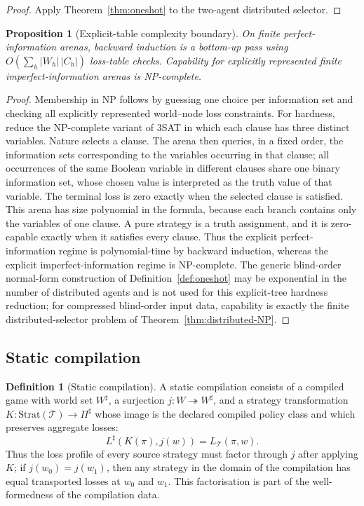 \documentclass[11pt]{article}
\theoremstyle{plain}
\newtheorem{proposition}[theorem]{Proposition}
\theoremstyle{definition}
\newtheorem{definition}[theorem]{Definition}
\theoremstyle{remark}
\begin{document}
\begin{proof}
Apply Theorem~\ref{thm:oneshot} to the two-agent distributed selector.
\end{proof}

\begin{proposition}[Explicit-table complexity boundary]\label{prop:pnp}
On finite perfect-information arenas, backward induction is a bottom-up pass
using $O(\sum_h|W_h|\,|C_h|)$ loss-table checks. Capability for explicitly
represented finite imperfect-information arenas is NP-complete.
\end{proposition}

\begin{proof}
Membership in NP follows by guessing one choice per information set and checking
all explicitly represented world--node loss constraints. For hardness, reduce the NP-complete variant of 3SAT in which each clause has
three distinct variables. Nature selects a clause. The arena then queries, in a
fixed order, the information sets corresponding to the variables occurring in
that clause;
all occurrences of the same Boolean variable in different clauses share one
binary information set, whose chosen value is interpreted as the truth value of
that variable. The terminal loss is zero exactly when the selected clause is
satisfied. This arena has size polynomial in the formula, because each branch
contains only the variables of one clause. A pure strategy is a truth assignment,
and it is zero-capable exactly when it satisfies every clause. Thus the explicit
perfect-information regime is polynomial-time by backward induction, whereas the
explicit imperfect-information regime is NP-complete. The generic blind-order
normal-form construction of Definition~\ref{def:oneshot} may be exponential in
the number of distributed agents and is not used for this explicit-tree hardness
reduction; for compressed blind-order input data, capability is exactly the
finite distributed-selector problem of Theorem~\ref{thm:distributed-NP}.
\end{proof}




\subsection{Static compilation}

\begin{definition}[Static compilation]\label{def:staticcomp}
A static compilation consists of a compiled game with world set $W^\sharp$, a
surjection $j:W\twoheadrightarrow W^\sharp$, and a strategy transformation
$K:\mathrm{Strat}(\mathcal T)\to\Pi^\sharp$ whose image is the declared
compiled policy class and which preserves aggregate losses:
\[
L^\sharp(K(\pi),j(w))=L_{\mathcal T}(\pi,w).
\]
Thus the loss profile of every source strategy must factor through $j$ after
applying $K$; if $j(w_0)=j(w_1)$, then any strategy in the domain of the
compilation has equal transported losses at $w_0$ and $w_1$. This factorisation
is part of the well-formedness of the compilation data.
\end{definition}
\end{document}
